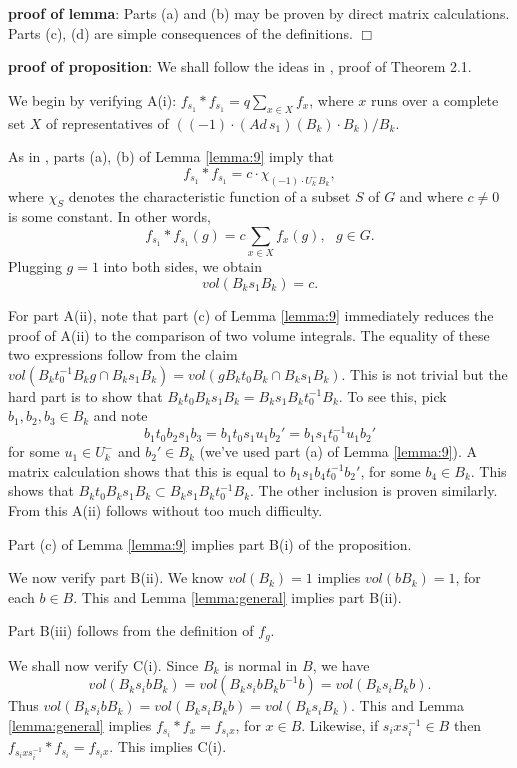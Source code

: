 \documentclass[12pt,letterpaper]{amsart}
\theoremstyle{definition}
\theoremstyle{remark}
\begin{document}
{\bf proof of lemma}: Parts (a) and (b) 
may be proven by direct matrix calculations. 
Parts (c), (d) are simple consequences of the definitions.
$\Box$

{\bf proof of proposition}: We shall follow the ideas in 
\cite{H}, proof of Theorem 2.1.

We begin by verifying A(i): $f_{s_1}*f_{s_1}=q\sum_{x\in X} f_x$, 
where $x$ runs over a complete set $X$ of representatives
of $((-1)\cdot (Ad\, s_1)(B_k)\cdot B_k)/B_k$. 

As in \cite{H}, parts (a), (b) of Lemma 
\ref{lemma:9} imply that 
\[
f_{s_1}*f_{s_1}=c\cdot \chi_{(-1)\cdot U^-_kB_k},
\]
where $\chi_S$ denotes the characteristic function of
a subset $S$ of $G$ and where $c\not= 0$ is some constant. 
In other words,
\[
f_{s_1}*f_{s_1}(g)=c\sum_{x\in X} f_x(g) ,\ \ \ g\in G.
\]
Plugging $g=1$ into both sides, we obtain
\[
vol(B_k s_1 B_k)=c.
\]

For part A(ii), note that part (c) of Lemma \ref{lemma:9}
immediately reduces the proof of A(ii) to the 
comparison of two volume integrals. 
The equality of these two expressions follow from the claim
$vol(B_kt_0^{-1}B_kg\cap B_ks_1B_k)
=vol(gB_kt_0B_k\cap B_ks_1B_k)$.
This is not trivial but the hard part is to show that 
$B_kt_0B_ks_1B_k=B_ks_1B_kt_0^{-1}B_k$. To see this, 
pick $b_1,b_2,b_3\in B_k$ and note 
\[
b_1t_0b_2s_1b_3=b_1t_0s_1u_1b_2'
=b_1s_1t_0^{-1}u_1b_2'
\]
for some $u_1\in U_k^-$ and $b_2'\in B_k$
(we've used part (a) of Lemma \ref{lemma:9}). A matrix calculation
shows that this is equal to $b_1s_1b_4t_0^{-1}b_2'$, for some
$b_4\in B_k$. This shows that $B_kt_0B_ks_1B_k\subset 
B_ks_1B_kt_0^{-1}B_k$. The other inclusion is proven similarly.
From this A(ii) follows without too much difficulty.

Part (c) of Lemma \ref{lemma:9} implies part B(i) of the 
proposition.

We now verify part B(ii). We know $vol(B_k)=1$ implies $vol(bB_k)=1$,
for each $b\in B$. 
This and Lemma \ref{lemma:general} implies part B(ii).

Part B(iii) follows from the definition of $f_g$.

We shall now verify C(i). Since $B_k$ is normal in $B$, we have
\[
vol(B_k s_i b B_k)=vol(B_k s_i b B_k b^{-1} b)=
vol(B_k s_i B_kb).
\]
Thus $vol(B_k s_i b B_k)=vol(B_k s_i B_k b)=vol(B_k s_i B_k)$.
This and Lemma \ref{lemma:general} implies 
$f_{s_i}*f_x=f_{s_ix}$, for $x\in B$. Likewise, if
$s_ixs_i^{-1}\in B$ then $f_{s_ixs_i^{-1}}*f_{s_i}=f_{s_ix}$.
This implies C(i).
\end{document}
